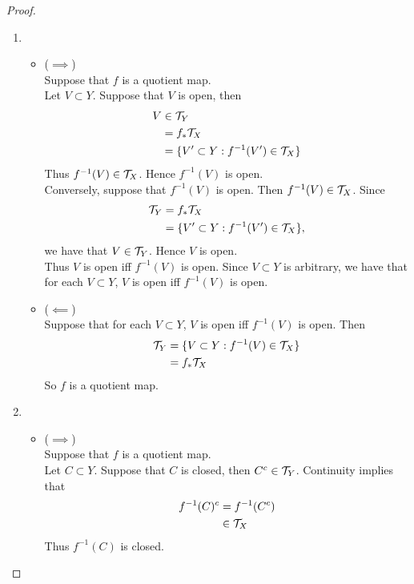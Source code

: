 \documentclass{book}
\begin{document}
	\begin{proof}\
		\begin{enumerate}
			\item 
			\begin{itemize}
				\item ($\implies$) \\
				Suppose that $f$ is a quotient map.\\
				Let $V \subset Y$. Suppose that $V$ is open, then 
				\begin{align*}
					V 
					& \in \mathcal{T}_Y \\
					& = f_*\mathcal{T}_X \\
					& = \{V' \subset Y: f^{-1}(V') \in \mathcal{T}_X \}
				\end{align*} 
				Thus $f^{-1}(V) \in \mathcal{T}_X$. Hence $f^{-1}(V)$ is open. \\
				Conversely, suppose that $f^{-1}(V)$ is open. Then $f^{-1}(V) \in \mathcal{T}_X$. Since
				\begin{align*}
					\mathcal{T}_Y 
					& = f_*\mathcal{T}_X \\
					& = \{V' \subset Y: f^{-1}(V') \in \mathcal{T}_X \},
				\end{align*}
				we have that $V \in \mathcal{T}_Y$. Hence $V$ is open. \\ 
				Thus $V$ is open iff $f^{-1}(V)$ is open. Since $V \subset Y$ is arbitrary, we have that for each $V \subset Y$, $V$ is open iff $f^{-1}(V)$ is open.
				\item ($\impliedby$) \\
				Suppose that for each $V \subset Y$, $V$ is open iff $f^{-1}(V)$ is open. Then 
				\begin{align*}
					\mathcal{T}_Y
					& = \{V \subset Y: f^{-1}(V) \in \mathcal{T}_X \} \\
					& = f_* \mathcal{T}_X
				\end{align*}
				So $f$ is a quotient map.
			\end{itemize}
			\item 
			\begin{itemize}
				\item ($\implies$) \\
				Suppose that $f$ is a quotient map.\\
				Let $C \subset Y$. Suppose that $C$ is closed, then $C^c \in \mathcal{T}_Y$. Continuity implies that
				\begin{align*}
					f^{-1}(C)^c 
					& = f^{-1}(C^c) \\
					& \in \mathcal{T}_X 
				\end{align*}
				Thus $f^{-1}(C)$ is closed. \\

\end{itemize}
\end{enumerate}
\end{proof}
\end{document}
